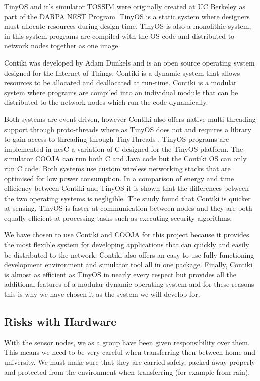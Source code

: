 \documentclass[a4paper,notitlepage]{article}
\begin{document}
TinyOS and it's simulator TOSSIM were originally created at UC Berkeley as part of the DARPA NEST Program. TinyOS is a static system where designers must allocate resources during design-time. TinyOS is also a monolithic system, in this system programs are compiled with the OS code and distributed to network nodes together as one image.

Contiki was developed by Adam Dunkels and is an open source operating system designed for the Internet of Things. Contiki is a dynamic system that allows resources to be allocated and deallocated at run-time. Contiki is a modular system where programs are compiled into an individual module that can be distributed to the network nodes which run the code dynamically.

Both systems are event driven, however Contiki also offers native multi-threading support through proto-threads where as TinyOS does not and requires a library to gain access to threading through TinyThreads \cite{?}. TinyOS programs are implemented in nesC a variation of C designed for the TinyOS platform. The simulator COOJA can run both C and Java code but the Contiki OS can only run C code. Both systems use custom wireless networking stacks that are optimised for low power consumption. In a comparison of energy and time efficiency between Contiki and TinyOS \cite{?} it is shown that the differences between the two operating systems is negligible. The study found that Contiki is quicker at sensing, TinyOS is faster at communication between nodes and they are both equally efficient at processing tasks such as executing security algorithms.

We have chosen to use Contiki and COOJA for this project because it provides the most flexible system for developing applications that can quickly and easily be distributed to the network. Contiki also offers an easy to use fully functioning development environment and simulator tool all in one package. Finally, Contiki is almost as efficient as TinyOS in nearly every respect but provides all the additional features of a modular dynamic operating system and for these reasons this is why we have chosen it as the system we will develop for. 

\subsection{Risks with Hardware}

With the sensor nodes, we as a group have been given responsibility over them. This means we need to be very careful when transferring then between home and university. We must make sure that they are carried safely, packed away properly and protected from the environment when transferring (for example from rain).
\end{document}
